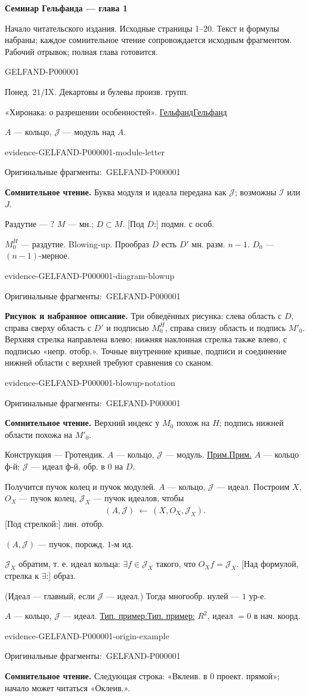 \documentclass[11pt]{article}
\let\MathUnderline\underline
\renewcommand{\underline}[1]{\ifmmode\MathUnderline{#1}\else\uline{#1}\fi}
\newcommand{\SourcePage}[2]{\par\smallskip\phantomsection\label{#1:source-page}{\small\sffamily\color{blue!55!black}#1}\par\smallskip}
\newcommand{\EvidenceBlock}[4]{%
 \par\smallskip\noindent\begin{minipage}{\linewidth}
 \begin{minipage}[t]{.47\linewidth}\vspace{0pt}\centering
 \csname evidence-#1-#2\endcsname\par
 {\scriptsize\SourceCropCaption\ #1}\par
 \end{minipage}\hfill
 \begin{minipage}[t]{.49\linewidth}\vspace{0pt}\raggedright
 {\small\color{orange!65!black}\textbf{#4} #3}\par
 \end{minipage}
 \end{minipage}\par\smallskip}
\newcommand{\Unclear}[3]{\EvidenceBlock{#1}{#2}{#3}{\ReadingCaption}}
\newcommand{\SourceFigure}[3]{\EvidenceBlock{#1}{#2}{#3}{\DiagramCaption}}
\newcommand{\SourceCropCaption}{Оригинальные фрагменты:}\newcommand{\ReadingCaption}{Сомнительное чтение.}\newcommand{\IncompleteCaption}{Неразобранный фрагмент.}\newcommand{\DiagramCaption}{Рисунок и набранное описание.}
\begin{document}
{\large\bfseries Семинар Гельфанда — глава 1}\par
{\small Начало читательского издания. Исходные страницы 1–20. Текст и формулы набраны; каждое сомнительное чтение сопровождается исходным фрагментом. Рабочий отрывок; полная глава готовится.}\par\medskip
\SourcePage{GELFAND-P000001}{unlabelled}
Понед. $21/\mathrm{IX}$.
Декартовы и булевы произв. групп.

«Хиронака: о разрешении особенностей».
\underline{Гельфанд}

$A$ — кольцо, $\mathcal{J}$ — модуль над $A$.
\Unclear{GELFAND-P000001}{module-letter}{Буква модуля и идеала передана как $\mathcal{J}$; возможны $\mathcal{I}$ или $J$.}

Раздутие — ?
$M$ — мн.; $D\subset M$.
[Под $D$:] подмн. с особ.

$M_0^H$ — раздутие. Blowing-up.
Прообраз $D$ есть $D'$ мн. разм. $n-1$.
$D_0$ — $(n-1)$-мерное.
\SourceFigure{GELFAND-P000001}{diagram-blowup}{Три обведённых рисунка: слева область с $D$, справа сверху область с $D'$ и подписью $M_0^H$, справа снизу область и подпись $M'_0$. Верхняя стрелка направлена влево; нижняя наклонная стрелка также влево, с подписью «непр. отобр.». Точные внутренние кривые, подписи и соединение нижней области с верхней требуют сравнения со сканом.}
\Unclear{GELFAND-P000001}{blowup-notation}{Верхний индекс у $M_0$ похож на $H$; подпись нижней области похожа на $M'_0$.}

Конструкция — Гротендик.
$A$ — кольцо, $\mathcal{J}$ — модуль.
\underline{Прим.} $A$ — кольцо ф-й;
$\mathcal{J}$ — идеал ф-й, обр. в $0$ на $D$.

Получится пучок колец и пучок модулей.
$A$ — кольцо, $\mathcal{J}$ — идеал.
Построим $X$, $O_X$ — пучок колец,
$\mathcal{J}_X$ — пучок идеалов, чтобы
\begin{gather*}
 (A,\mathcal{J})\ \longleftarrow\ (X,O_X,\mathcal{J}_X).
\end{gather*}
[Под стрелкой:] лин. отобр.

$(A,\mathcal{J})$ — пучок, порожд. $1$-м ид.

$\mathcal{J}_X$ обратим, т. е. идеал кольца:
$\exists f\in\mathcal{J}_X$ такого, что $O_Xf=\mathcal{J}_X$.
[Над формулой, стрелка к $\exists$:] образ.

(Идеал — главный, если $\mathcal{J}$ — идеал.)
Тогда многообр. нулей — $1$ ур-е.

$A$ — кольцо, $\mathcal{J}$ — идеал.
\underline{Тип. пример:} $R^2$, идеал $=0$ в нач. коорд.
\Unclear{GELFAND-P000001}{origin-example}{Следующая строка: «Вклеив. в $0$ проект. прямой»; начало может читаться «Оклеив.».}
\end{document}

